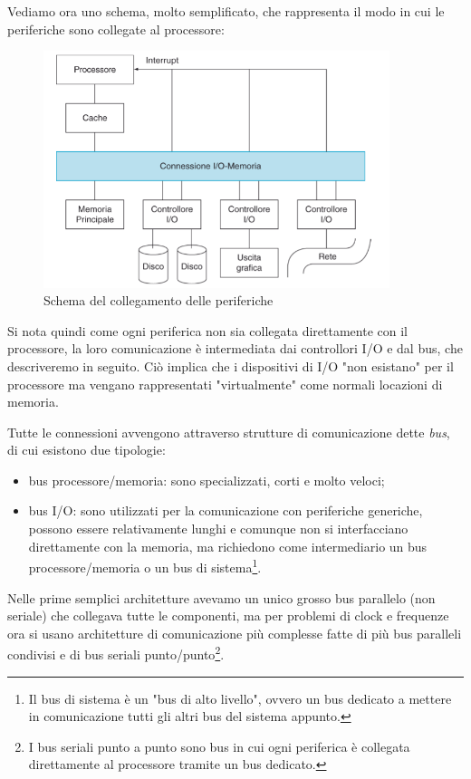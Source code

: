 \documentclass[class=book, crop=false, oneside]{standalone}
\begin{document}
Vediamo ora uno schema, molto semplificato, che rappresenta il modo in cui le periferiche sono collegate al processore:
\begin{figure}
	\centering
	\includegraphics[width=0.9\textwidth,keepaspectratio]{schema-periferiche}
	\caption{Schema del collegamento delle periferiche}
\end{figure}
Si nota quindi come ogni periferica non sia collegata direttamente con il processore, la loro comunicazione è intermediata dai controllori I/O e dal bus, che descriveremo in seguito.
Ciò implica che i dispositivi di I/O "non esistano" per il processore ma vengano rappresentati "virtualmente" come normali locazioni di memoria.

Tutte le connessioni avvengono attraverso strutture di comunicazione dette \emph{bus}, di cui esistono due tipologie:
\begin{itemize}
	\item bus processore/memoria: sono specializzati, corti e molto veloci;
	\item bus I/O: sono utilizzati per la comunicazione con periferiche generiche, possono essere relativamente lunghi e comunque non si interfacciano direttamente con la memoria, ma richiedono come intermediario un bus processore/memoria o un bus di sistema\footnote{Il bus di sistema è un "bus di alto livello", ovvero un bus dedicato a  mettere in comunicazione tutti gli altri bus del sistema appunto.}.
\end{itemize}
Nelle prime semplici architetture avevamo un unico grosso bus parallelo (non seriale) che collegava tutte le componenti, ma per problemi di clock e frequenze ora si usano architetture di comunicazione più complesse fatte di più bus paralleli condivisi e di bus seriali punto/punto\footnote{I bus seriali punto a punto sono bus in cui ogni periferica è collegata direttamente al processore tramite un bus dedicato.}.
\end{document}
